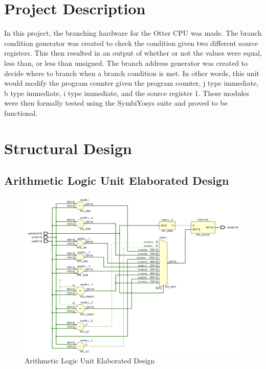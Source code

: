 \documentclass[
    a4paper, %
	12pt, %
    ]{CSSullivanBusinessReport}
\begin{document}
\begin{fullwidth} %

\section{Project Description} %

In this project, the branching hardware for the Otter CPU was made. The branch condition generator was created to check the condition given two different source registers. This then resulted in an output of whether or not the values were equal, less than, or less than unsigned. The branch address generator was created to decide where to branch when a branch condition is met. In other words, this unit would modify the program counter given the program counter, j type immediate, b type immediate, i type immediate, and the source register 1. These modules were then formally tested using the SymbiYosys suite and proved to be functional.

\section{Structural Design} %

\subsection{Arithmetic Logic Unit Elaborated Design} %

\begin{figure}[H]
    \centering
    \captionsetup{style=widetable}
    \includegraphics[width=.80\pdfpagewidth]{Figures/ALU-Elaborated-Design.png}
    \caption{Arithmetic Logic Unit Elaborated Design}
    \label{fig:ALUElaboratedDesign}
\end{figure}


\end{fullwidth}
\end{document}
